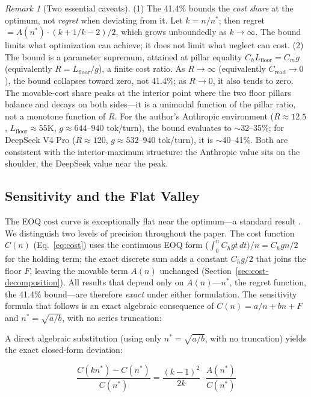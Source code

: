 \documentclass[11pt]{article}
\theoremstyle{definition}
\theoremstyle{remark}
\newtheorem{remark}[theorem]{Remark}
\begin{document}
\begin{remark}[Two essential caveats]
(1) The 41.4\% bounds the \emph{cost share} at the optimum, not \emph{regret} when deviating from it. Let $k = n/n^*$; then regret $= A(n^*) \cdot (k + 1/k - 2)/2$, which grows unboundedly as $k \to \infty$. The bound limits what optimization can achieve; it does not limit what neglect can cost. (2) The bound is a parameter supremum, attained at pillar equality $C_h L_{\text{floor}} = C_m g$ (equivalently $R = L_{\text{floor}}/g$), a finite cost ratio. As $R \to \infty$ (equivalently $C_{\text{read}} \to 0$), the bound collapses toward zero, not 41.4\%; as $R \to 0$, it also tends to zero. The movable-cost share peaks at the interior point where the two floor pillars balance and decays on both sides---it is a unimodal function of the pillar ratio, not a monotone function of $R$. For the author's Anthropic environment ($R \approx 12.5$, $L_{\text{floor}} \approx 55$K, $g \approx 644$--$940$ tok/turn), the bound evaluates to $\sim$32--35\%; for DeepSeek V4 Pro ($R \approx 120$, $g \approx 532$--$940$ tok/turn), it is $\sim$40--41\%. Both are consistent with the interior-maximum structure: the Anthropic value sits on the shoulder, the DeepSeek value near the peak.
\end{remark}

\subsection{Sensitivity and the Flat Valley}
\label{sec:sensitivity}

The EOQ cost curve is exceptionally flat near the optimum---a standard result \citep{silver2017}. We distinguish two levels of precision throughout the paper. The cost function $C(n)$ (Eq.~\ref{eq:cost}) uses the continuous EOQ form ($\int_0^n C_h g t\,dt)/n = C_h g n/2$ for the holding term; the exact discrete sum adds a constant $C_h g/2$ that joins the floor $F$, leaving the movable term $A(n)$ unchanged (Section~\ref{sec:cost-decomposition}). All results that depend only on $A(n)$---$n^*$, the regret function, the 41.4\% bound---are therefore \emph{exact} under either formulation. The sensitivity formula that follows is an exact algebraic consequence of $C(n) = a/n + bn + F$ and $n^* = \sqrt{a/b}$, with no series truncation:

A direct algebraic substitution (using only $n^* = \sqrt{a/b}$, with no truncation) yields the exact closed-form deviation:

\begin{equation}
\frac{C(kn^*) - C(n^*)}{C(n^*)} = \frac{(k-1)^2}{2k} \cdot \frac{A(n^*)}{C(n^*)}
\label{eq:sensitivity}
\end{equation}
\end{document}
